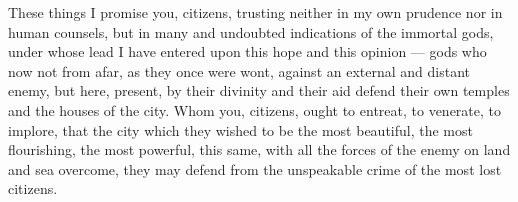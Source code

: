  These things I promise you, citizens, trusting neither in my own prudence nor in human counsels, but in many and undoubted indications of the immortal gods, under whose lead I have entered upon this hope and this opinion --- gods who now not from afar, as they once were wont, against an external and distant enemy, but here, present, by their divinity and their aid defend their own temples and the houses of the city. Whom you, citizens, ought to entreat, to venerate, to implore, that the city which they wished to be the most beautiful, the most flourishing, the most powerful, this same, with all the forces of the enemy on land and sea overcome, they may defend from the unspeakable crime of the most lost citizens.
